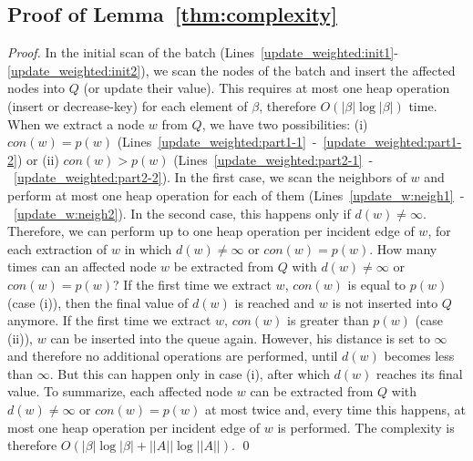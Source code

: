 \documentclass[english]{llncs}
\begin{document}
\subsection{Proof of Lemma~\ref{thm:complexity}}
\label{sub:proof_complexity}
\begin{proof}
In the initial scan of the batch (Lines~\ref{update_weighted:init1}-\ref{update_weighted:init2}), we scan the nodes of the batch and insert the affected nodes into $Q$ (or update their value). This requires at most one heap operation (insert or decrease-key) for each element of $\beta$, therefore $O(|\beta| \log|\beta|)$ time.
When we extract a node $w$ from $Q$, we have two possibilities: (i) $con(w)=p(w)$ (Lines~\ref{update_weighted:part1-1}~-~\ref{update_weighted:part1-2}) or (ii) $con(w)>p(w)$ (Lines~\ref{update_weighted:part2-1}~-~\ref{update_weighted:part2-2}). In the first case, we scan the neighbors of $w$ and perform at most one heap operation for each of them (Lines~\ref{update_w:neigh1}~-~\ref{update_w:neigh2}). In the second case, this happens only if $d(w)\neq \infty$. Therefore, we can perform up to one heap operation per incident edge of $w$, for each extraction of $w$ in which $d(w)\neq \infty$ or $con(w)=p(w)$.
How many times can an affected node $w$ be extracted from $Q$ with $d(w) \neq \infty$ or $con(w)=p(w)$? If the first time we extract $w$, $con(w) $ is equal to $p(w)$ (case (i)), then the final value of $d(w)$ is reached and $w$ is not inserted into $Q$ anymore. If the first time we extract $w$, $con(w)$ is greater than $p(w)$ (case (ii)), $w$ can be inserted into the queue again. However, his distance is set to $\infty$ and therefore no additional operations are performed, until $d(w)$ becomes less than $\infty$. But this can happen only in case (i), after which $d(w)$ reaches its final value. To summarize, each affected node $w$ can be extracted from $Q$ with $d(w)\neq \infty$ or $con(w)=p(w)$ at most twice and, every time this happens, at most one heap operation per incident edge of $w$ is performed. The complexity is therefore $O(|\beta |\log |\beta | + ||A || \log ||A ||)$. \qed
\end{proof}
\end{document}
